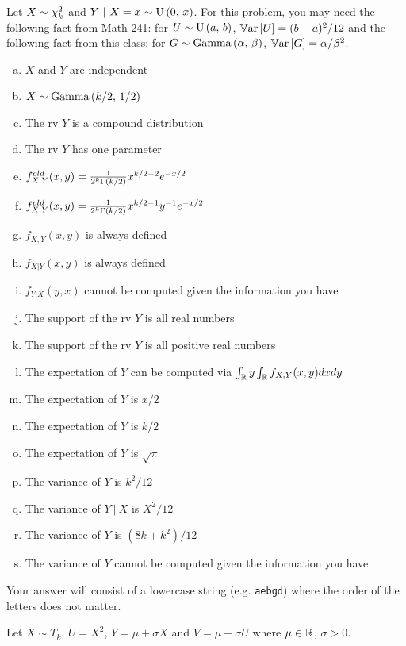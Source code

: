 \documentclass[12pt,landscape]{article}
\newcommand{\instr}{\small Your answer will consist of a lowercase string (e.g. \texttt{aebgd}) where the order of the letters does not matter. \normalsize}
\begin{document}

\problem{} Let $X \sim \chi^2_{k}$ and $Y~|~X = x \sim \mathrm{U}\left(0,\,x\right)$. For this problem, you may need the following fact from Math 241: for $U \sim \mathrm{U}\left(a,\,b\right)$,  $\mathbb{V}\text{ar}\left[U\right] = (b-a)^2 / 12$ and the following fact from this class: for $G \sim \mathrm{Gamma}\left(\alpha,\,\beta\right)$, $\mathbb{V}\text{ar}\left[G\right] = \alpha / \beta^2$.

\vspace{-0.2cm}\benum{} 

\begin{enumerate}[(a)]
\item $X$ and $Y$ are independent
\item $X \sim \mathrm{Gamma}\left(k/2,\,1/2\right)$
\item The rv $Y$ is a compound distribution
\item The rv $Y$ has one parameter
\item $f^{old}_{X,Y}(x,y) = \frac{1}{2^k \Gamma\left(k / 2\right)}x^{k/2 - 2} e^{-x/2}$
\item $f^{old}_{X,Y}(x,y) = \frac{1}{2^k \Gamma\left(k / 2\right)}x^{k/2 - 1} y^{-1} e^{-x/2}$
\item $f_{X,Y}(x,y)$ is always defined
\item $f_{X|Y}(x,y)$ is always defined
\item $f_{Y|X}(y,x)$ cannot be computed given the information you have
\item The support of the rv $Y$ is all real numbers
\item The support of the rv $Y$ is all positive real numbers
\item The expectation of $Y$ can be computed via $\int_{\mathbb{R}} y \int_{\mathbb{R}} f_{X,Y}(x,y) dx dy$  
\item The expectation of $Y$ is $x/2$
\item The expectation of $Y$ is $k/2$
\item The expectation of $Y$ is $\sqrt{\pi}$
\item The variance of $Y$ is $k^2 / 12$ 
\item The variance of $Y~|~X$ is $X^2 / 12$ 
\item The variance of $Y$ is $(8k + k^2) / 12$ 
\item The variance of $Y$ cannot be computed given the information you have
\end{enumerate}
\eenum\instr\pagebreak


\problem{} Let $X \sim T_k$, $U = X^2$, $Y = \mu + \sigma X$ and $V = \mu + \sigma  U$ where $\mu \in \mathbb{R}$, $\sigma > 0$.
\end{document}

